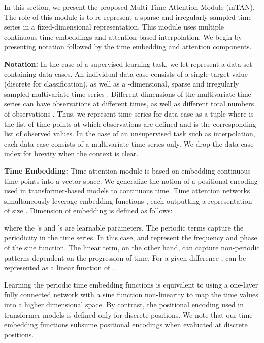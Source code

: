 \documentclass{article} \usepackage{iclr2021_conference,times}
\newcommand{\acro}{{mTAN}}
\begin{document}
In this section, we present the proposed Multi-Time Attention Module (\acro). The role of this module is to re-represent a sparse and irregularly sampled time series in a fixed-dimensional representation. This module uses multiple continuous-time embeddings and attention-based interpolation. We begin by presenting notation followed by the time embedding and attention components.

\textbf{Notation:}
In the case of a supervised learning task, we let  represent a data set containing
 data cases. An individual data case consists of
a single target value  (discrete for classification), as well as a -dimensional, sparse and irregularly
sampled multivariate time series . Different dimensions  of the multivariate
time series can have observations at different times, as well as different total
numbers of observations . Thus, we represent time series  for data case  as a tuple
  where 
is the list of time points at which observations are defined and 
 is the corresponding list of observed values. In the case of an unsupervised task such as interpolation, each data case consists of a multivariate time series  only. We drop the data case index  for brevity when the context is clear.



\textbf{Time Embedding:}
Time attention module is based on embedding continuous time points into a vector space. We generalize the notion of a positional encoding used in transformer-based models to continuous time. Time attention networks simultaneously leverage   embedding functions , each outputting a representation of size . Dimension  of embedding  is defined as follows:


where the 's and 's are learnable parameters. The periodic terms capture the periodicity in the time series. In this case,  and  represent the frequency and phase of the sine function. The linear term, on the other hand, can capture non-periodic patterns dependent on the progression of time. For a given difference ,  can be represented as a linear function of . 

Learning the periodic time embedding functions is equivalent to using a one-layer fully connected network with a sine function non-linearity to map the time values into a higher dimensional space. By contrast, the positional encoding used in transformer models is defined only for discrete positions.  We note that our time embedding functions subsume positional encodings when evaluated at discrete positions.
\end{document}
